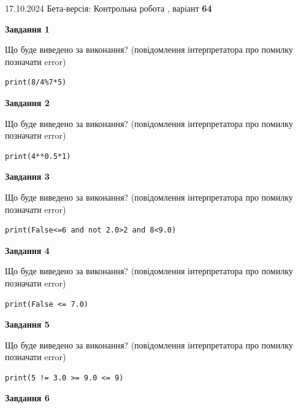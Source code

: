 \documentclass[12pt, ukrainian]{article}
\begin{document}
{\Large{17.10.2024 Бета-версія: Контрольна робота , варіант  \No \textbf { 64 }\par}}
{
\begin {large}
{\begin {center}\textbf{Завдання 1}\end {center}}

Що буде виведено за виконання? (повідомлення інтерпретатора про помилку позначати error)\par
\begin{verbatim}
print(8/4%7*5)
\end{verbatim}

{\begin {center}\textbf{Завдання 2}\end {center}}

Що буде виведено за виконання? (повідомлення інтерпретатора про помилку позначати error)\par
\begin{verbatim}
print(4**0.5*1)
\end{verbatim}

{\begin {center}\textbf{Завдання 3}\end {center}}

Що буде виведено за виконання? (повідомлення інтерпретатора про помилку позначати error)\par
\begin{verbatim}
print(False<=6 and not 2.0>2 and 8<9.0)
\end{verbatim}

{\begin {center}\textbf{Завдання 4}\end {center}}

Що буде виведено за виконання? (повідомлення інтерпретатора про помилку позначати error)\par
\begin{verbatim}
print(False <= 7.0)
\end{verbatim}

{\begin {center}\textbf{Завдання 5}\end {center}}

Що буде виведено за виконання? (повідомлення інтерпретатора про помилку позначати error)\par
\begin{verbatim}
print(5 != 3.0 >= 9.0 <= 9)
\end{verbatim}

{\begin {center}\textbf{Завдання 6}\end {center}}


\end{large}}
\end{document}
